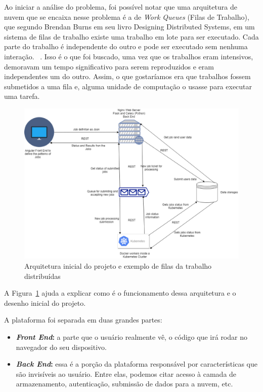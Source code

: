 \documentclass[11pt,twoside]{article}
\begin{document}
Ao iniciar a análise do problema, foi possível notar que uma arquitetura de nuvem que se encaixa nesse problema é a de \emph{Work Queues} (Filas de Trabalho), que segundo Brendan Burns em seu livro
Designing Distributed Systems, em um sistema de filas de trabalho existe uma trabalho em lote para ser executado. Cada parte do trabalho é independente do outro e pode ser executado sem nenhuma interação. 
~\cite{BB}.
Isso é o que foi buscado, uma vez que os trabalhos eram intensivos, demoravam um tempo significativo para serem reproduzidos e eram independentes um do outro. Assim, o que gostaríamos era que trabalhos fossem submetidos
a uma fila e, alguma unidade de computação o usasse para executar uma tarefa.

\begin{figure}[!h]
  \centering
  \includegraphics[scale=0.4]{arch.eps}
  \caption{Arquitetura inicial do projeto e exemplo de filas da trabalho distribuídas}
  \label{fig:archtec}
\end{figure}

A Figura~\ref{fig:archtec} ajuda a explicar como é o funcionamento dessa arquitetura e o desenho inicial do projeto.

A plataforma foi separada em duas grandes partes:

\begin{itemize}
  \item \textbf{\emph{Front End}:} a parte que o usuário realmente vê, o código que irá rodar no navegador do seu dispositivo. 
  \item \textbf{\emph{Back End}:} essa é a porção da plataforma responsável por características que são invisíveis ao usuário. Entre elas, podemos citar acesso à camada de armazenamento, autenticação,
  submissão de dados para a nuvem, etc.
\end{itemize}
\end{document}
